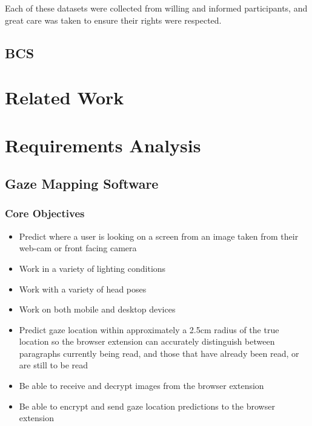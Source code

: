 \documentclass[twocolumn]{report}
\begin{document}
Each of these datasets were collected from willing and informed participants, and great care was taken to ensure their rights were respected. 

\section*{BCS }


\chapter{Related Work}

\chapter{Requirements Analysis}

\section{Gaze Mapping Software}

\subsection{Core Objectives} 
    
\begin{itemize}
    \item Predict where a user is looking on a screen from an image taken from their web-cam or front facing camera 
    \item Work in a variety of lighting conditions 
    \item Work with a variety of head poses 
    \item Work on both mobile and desktop devices
    \item Predict gaze location within approximately a 2.5cm radius of the true location so the browser extension can accurately distinguish between paragraphs currently being read, and those that have already been read, or are still to be read
    \item Be able to receive and decrypt images from the browser extension 
    \item Be able to encrypt and send gaze location predictions to the browser extension
\end{itemize}
\end{document}
